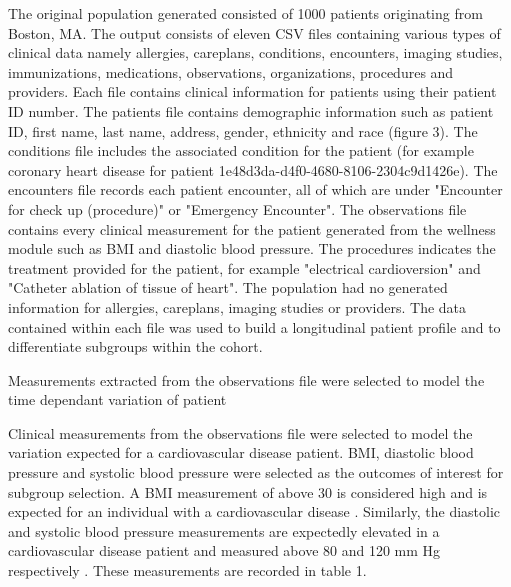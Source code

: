 \documentclass{bioinfo}
\begin{document}
\begin{methods}
The original population generated consisted of 1000 patients originating from Boston, MA. The output consists of eleven CSV files containing various types of clinical data namely allergies, careplans, conditions, encounters, imaging studies, immunizations, medications, observations, organizations, procedures and providers. Each file contains clinical information for patients using their patient ID number. The patients file contains demographic information such as patient ID, first name, last name, address, gender, ethnicity and race (figure 3). The conditions file includes the associated condition for the patient (for example coronary heart disease for patient 1e48d3da-d4f0-4680-8106-2304c9d1426e). The encounters file records each patient encounter, all of which are under "Encounter for check up (procedure)" or "Emergency Encounter". The observations file contains every clinical measurement for the patient generated from the wellness module such as BMI and diastolic blood pressure. The procedures indicates the treatment provided for the patient, for example "electrical cardioversion" and "Catheter ablation of tissue of heart". The population had no generated information for  allergies, careplans, imaging studies or providers. The data contained within each file was used to build a longitudinal patient profile and to differentiate subgroups within the cohort.


Measurements extracted from the observations file were selected to model the time dependant variation of patient 

Clinical measurements from the observations file were selected to model the variation expected for a cardiovascular disease patient. BMI, diastolic blood pressure and systolic blood pressure were selected as the outcomes of interest for subgroup selection. A BMI measurement of above 30 is considered high and is expected for an individual with a cardiovascular disease \cite{Ellsworth2014}. Similarly, the diastolic and systolic blood pressure measurements are expectedly elevated in a cardiovascular disease patient and measured above 80 and 120 mm Hg respectively \cite{Ellsworth2014}.   
These measurements are recorded in table 1. 





\end{methods}
\end{document}
